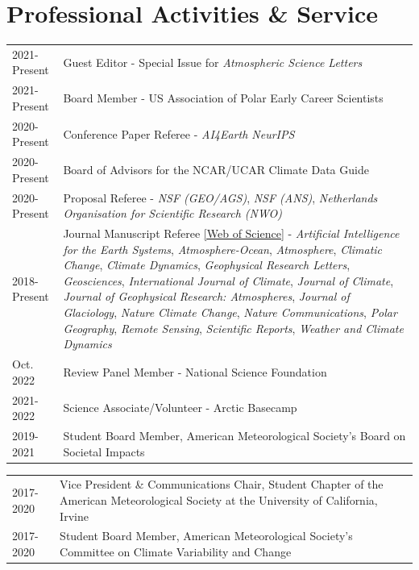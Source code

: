 \documentclass[margin,line,palatino,courier,10pt]{res}
\begin{document}
\begin{resume}
\noindent\textcolor{Cerulean}{\makebox[\linewidth][r]{\rule{\textwidth}{5pt}}}
\section{\sc \textcolor{Cerulean}{\large{\textbf{Professional Activities \& Service}}}}
\vspace*{0.05in}
\begin{tabular}{@{}p{0.9in}p{4in}}
2021-Present & Guest Editor - Special Issue for \textit{Atmospheric Science Letters}\\
2021-Present & Board Member - US Association of Polar Early Career Scientists\\
2020-Present & Conference Paper Referee - \textit{AI4Earth NeurIPS}\\
2020-Present & Board of Advisors for the NCAR/UCAR Climate Data Guide\\
2020-Present & Proposal Referee - \textit{NSF (GEO/AGS)}, \textit{NSF (ANS)}, \textit{Netherlands Organisation for Scientific Research (NWO)}\\
2018-Present & Journal Manuscript Referee \href{https://www.webofscience.com/wos/author/record/J-4764-2019}{[Web of Science]} - \textit{Artificial Intelligence for the Earth Systems}, \textit{Atmosphere-Ocean}, \textit{Atmosphere}, \textit{Climatic Change}, \textit{Climate Dynamics}, \textit{Geophysical Research Letters}, \textit{Geosciences}, \textit{International Journal of Climate}, \textit{Journal of Climate}, \textit{Journal of Geophysical Research: Atmospheres}, \textit{Journal of Glaciology}, \textit{Nature Climate Change}, \textit{Nature Communications}, \textit{Polar Geography}, \textit{Remote Sensing}, \textit{Scientific Reports}, \textit{Weather and Climate Dynamics} \\
Oct. 2022 & Review Panel Member - National Science Foundation\\
2021-2022 & Science Associate/Volunteer - Arctic Basecamp\\
2019-2021& Student Board Member, American Meteorological Society's Board on Societal Impacts\\
\end{tabular}
\begin{tabular}{@{}p{0.9in}p{4in}}
2017-2020 & Vice President \& Communications Chair, Student Chapter of the American Meteorological Society at the University of California, Irvine\\
2017-2020 & Student Board Member, American Meteorological Society's Committee on Climate Variability and Change\\

\end{tabular}
\end{resume}
\end{document}
